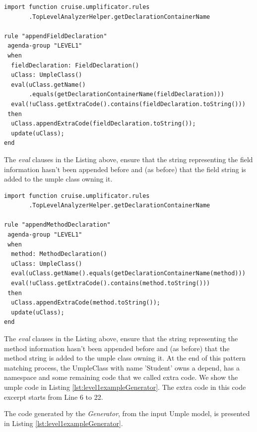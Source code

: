\begin{lstlisting}[language={drools},label={lst:appendField}, caption=Rule appendFieldDeclaration]
import function cruise.umplificator.rules
       .TopLevelAnalyzerHelper.getDeclarationContainerName
       
rule "appendFieldDeclaration"
 agenda-group "LEVEL1" 
 when
  fieldDeclaration: FieldDeclaration()
  uClass: UmpleClass()
  eval(uClass.getName()
       .equals(getDeclarationContainerName(fieldDeclaration)))
  eval(!uClass.getExtraCode().contains(fieldDeclaration.toString()))
 then
  uClass.appendExtraCode(fieldDeclaration.toString());
  update(uClass);
end
\end{lstlisting}

The \textit{eval} clauses in the Listing above, ensure that the string representing the field information hasn't been appended before and (as before) that the field string is added to the umple class owning it.

\begin{lstlisting}[language={drools},label={lst:appendMethod}, caption=Rule appendMethodDeclaration]
import function cruise.umplificator.rules
       .TopLevelAnalyzerHelper.getDeclarationContainerName
       
rule "appendMethodDeclaration"
 agenda-group "LEVEL1" 
 when
  method: MethodDeclaration()
  uClass: UmpleClass()
  eval(uClass.getName().equals(getDeclarationContainerName(method)))
  eval(!uClass.getExtraCode().contains(method.toString()))
 then
  uClass.appendExtraCode(method.toString());
  update(uClass);
end
\end{lstlisting}

The \textit{eval} clauses in the Listing above, ensure that the string representing the method information hasn't been appended before and (as before) that the method string is added to the umple class owning it. 
At the end of this pattern matching process, the UmpleClass with name 'Student' owns a depend, has a namespace and some remaining code that we called extra code. We show the umple code in Listing \ref{lst:level1exampleGenerator}. The extra code in this code excerpt starts from Line 6 to 22.

The code generated by the \textit{Generator}, from the input Umple model, is presented in Listing \ref{lst:level1exampleGenerator}.

